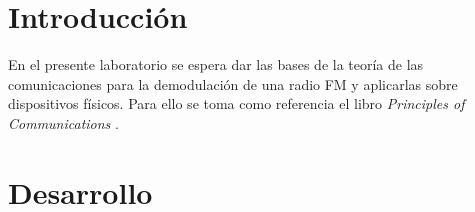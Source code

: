 \section{Introducción}
	En el presente laboratorio se espera dar las bases de la teoría de las comunicaciones para la demodulación de una radio FM y aplicarlas sobre dispositivos físicos.
Para ello se toma como referencia el libro \emph{Principles of Communications} \cite{PrinciplesofCommunications}.

\section{Desarrollo}